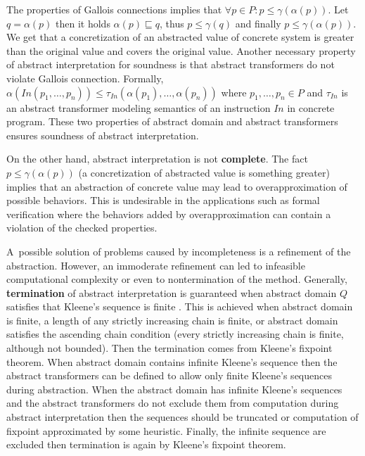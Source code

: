 \documentclass[a4paper, 12pt]{article}
\newcommand{\aord}[0]{\sqsubseteq}
\newcommand{\cord}[0]{\leq}
\newcommand{\adom}[0]{Q}
\newcommand{\aitem}[0]{q}
\newcommand{\cdom}[0]{P}
\newcommand{\citem}[0]{p}
\newcommand{\atrans}[0]{\tau}
\newcommand{\afun}[0]{\alpha}
\newcommand{\cfun}[0]{\gamma}
\begin{document}
The properties of Gallois connections implies that
$\forall \citem \in \cdom: \citem \cord \cfun(\afun(\citem))$.
Let $q = \afun(\citem)$ then it holds $\alpha(\citem) \aord \aitem$,
thus $\citem \cord \cfun(\aitem)$ and finally $\citem \cord \cfun(\afun(\citem))$.
We get that a concretization of an abstracted value of concrete system
is greater than the original value and covers the original value.
Another necessary property of abstract interpretation for soundness is
that abstract transformers do not violate Gallois connection.
Formally, $\alpha(In(\citem_1,\ldots,\citem_n)) \cord \atrans_{In}(\alpha(\citem_1),\ldots, \alpha(\citem_n))$
where $\citem_1,\ldots,\citem_n \in \cdom$ and $\atrans_{In}$ is an abstract transformer
modeling semantics of an instruction $In$ in concrete program.
These two properties of abstract domain and abstract transformers ensures
soundness of abstract interpretation.

On the other hand, abstract interpretation is not \textbf{complete}.
The fact $\citem \cord \cfun(\afun(\citem))$ (a concretization of abstracted value
is something greater) implies that an abstraction of concrete value may lead
to overapproximation of possible behaviors.
This is undesirable in the applications such as formal verification
where the behaviors added by overapproximation can contain
a violation of the checked properties.

A~possible solution of problems caused by incompleteness is a refinement of the abstraction.
However, an immoderate refinement can led to infeasible computational complexity
or even to nontermination of the method.
Generally, \textbf{termination} of abstract interpretation is guaranteed
when abstract domain $\adom$ satisfies that Kleene's sequence is finite \cite{popl77}.
This is achieved when abstract domain is finite, a length of any strictly
increasing chain is finite, or abstract domain satisfies the ascending chain
condition (every strictly increasing chain is finite, although not bounded).
Then the termination comes from Kleene's fixpoint theorem.
When abstract domain contains infinite Kleene's sequence
then the abstract transformers can be defined to allow only finite
Kleene's sequences during abstraction.
When the abstract domain has infinite Kleene's sequences and
the abstract transformers do not exclude them from computation during abstract
interpretation then the sequences should be truncated or computation
of fixpoint approximated by some heuristic.
Finally, the infinite sequence are excluded then termination is
again by Kleene's fixpoint theorem.
\end{document}
